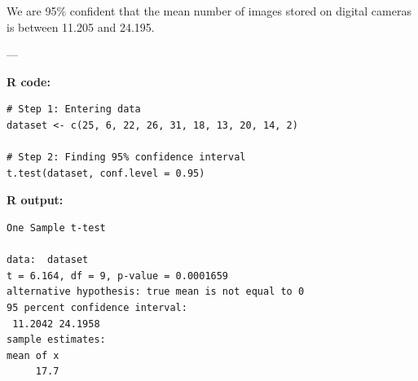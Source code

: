 \begin{example}
We are 95\% confident that the mean number of images stored on digital cameras is between 11.205 and 24.195.

---

\noindent\textbf{R code:}

\begin{tcolorbox}[colback=gray!10, colframe=black!45, arc=2mm]
\begin{verbatim}
# Step 1: Entering data
dataset <- c(25, 6, 22, 26, 31, 18, 13, 20, 14, 2)

# Step 2: Finding 95% confidence interval
t.test(dataset, conf.level = 0.95)
\end{verbatim}
\end{tcolorbox}

\noindent\textbf{R output:}

\begin{tcolorbox}[colback=gray!10, colframe=black!45, arc=2mm]
\begin{verbatim}
One Sample t-test

data:  dataset
t = 6.164, df = 9, p-value = 0.0001659
alternative hypothesis: true mean is not equal to 0
95 percent confidence interval:
 11.2042 24.1958
sample estimates:
mean of x 
     17.7 
\end{verbatim}
\end{tcolorbox}
\end{example}
